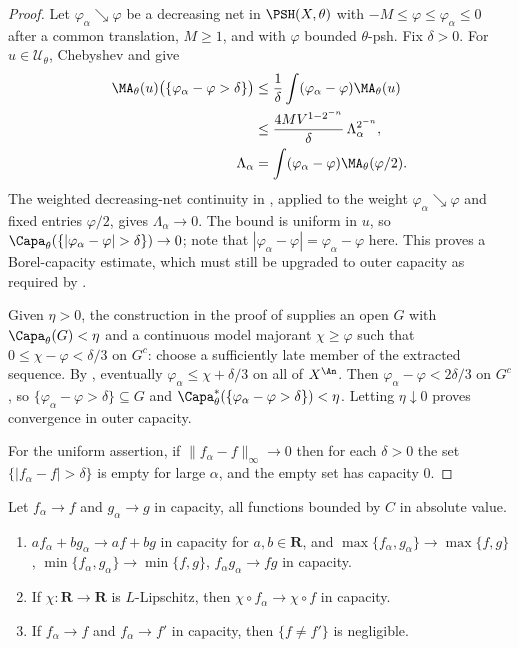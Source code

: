 \begin{proof}
Let $\varphi_\alpha\searrow\varphi$ be a decreasing net in
$\PSH(X,\theta)$ with $-M\leq\varphi\leq\varphi_\alpha\leq0$ after a
common translation, $M\geq1$, and with $\varphi$ bounded
$\theta$-psh.  Fix $\delta>0$.  For $u\in\mathcal U_\theta$, Chebyshev
and  give
\[
 \begin{aligned}
 \MA_\theta(u)\bigl(\{\varphi_\alpha-\varphi>\delta\}\bigr)
 &\leq\frac1\delta\int(\varphi_\alpha-\varphi)\MA_\theta(u)\\
 &\leq\frac{4MV^{1-2^{-n}}}{\delta}\,\Lambda_\alpha^{2^{-n}},\\
 \Lambda_\alpha&=\int(\varphi_\alpha-\varphi)\MA_\theta(\varphi/2).
 \end{aligned}
\]
The weighted decreasing-net continuity in
, applied to the weight
$\varphi_\alpha\searrow\varphi$ and fixed entries $\varphi/2$, gives
$\Lambda_\alpha\to0$.  The bound is uniform in $u$, so
$\Capa_\theta(\{|\varphi_\alpha-\varphi|>\delta\})\to0$; note that
$|\varphi_\alpha-\varphi|=\varphi_\alpha-\varphi$ here.
This proves a Borel-capacity estimate, which must still be upgraded to
outer capacity as required by .

Given $\eta>0$, the construction in the proof of
 supplies an open $G$ with
$\Capa_\theta(G)<\eta$ and a continuous model majorant $\chi\geq\varphi$
such that $0\leq\chi-\varphi<\delta/3$ on $G^c$: choose a sufficiently
late member of the extracted sequence.  By ,
eventually $\varphi_\alpha\leq\chi+\delta/3$ on all of $X^{\An}$.
Then $\varphi_\alpha-\varphi<2\delta/3$ on $G^c$, so
$\{\varphi_\alpha-\varphi>\delta\}\subseteq G$ and
$\Capa_\theta^*(\{\varphi_\alpha-\varphi>\delta\})<\eta$.
Letting $\eta\downarrow0$ proves convergence in outer capacity.

For the uniform assertion, if $\|f_\alpha-f\|_\infty\to0$ then for each
$\delta>0$ the set $\{|f_\alpha-f|>\delta\}$ is empty for large
$\alpha$, and the empty set has capacity $0$.
\end{proof}

\begin{proposition}
\label{prop:ch25-capacity-convergence-calculus}
Let $f_\alpha\to f$ and $g_\alpha\to g$ in capacity, all functions
bounded by $C$ in absolute value.
\begin{enumerate}
\item\label{itm:ch25-ccc:lin}
 $af_\alpha+bg_\alpha\to af+bg$ in capacity for $a,b\in\mathbf R$, and
 $\max\{f_\alpha,g_\alpha\}\to\max\{f,g\}$,
 $\min\{f_\alpha,g_\alpha\}\to\min\{f,g\}$,
 $f_\alpha g_\alpha\to fg$ in capacity.
\item\label{itm:ch25-ccc:lip}
 If $\chi:\mathbf R\to\mathbf R$ is $L$-Lipschitz, then
 $\chi\circ f_\alpha\to\chi\circ f$ in capacity.
\item\label{itm:ch25-ccc:unique}
 If $f_\alpha\to f$ and $f_\alpha\to f'$ in capacity, then
 $\{f\neq f'\}$ is negligible.
\end{enumerate}
\end{proposition}

